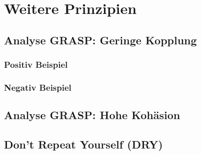 \chapter{Weitere Prinzipien}
\section{Analyse GRASP: Geringe Kopplung}
\subsection{Positiv Beispiel}
\subsection{Negativ Beispiel}
\section{Analyse GRASP: Hohe Kohäsion}
\section{Don't Repeat Yourself (DRY)}